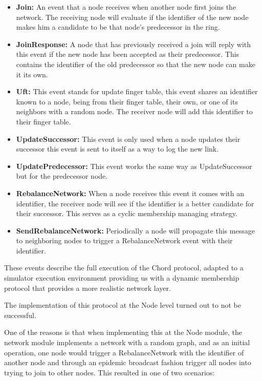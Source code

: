 \begin{itemize}
  \item \textbf{Join: } An event that a node receives when another node first joins
the network. The receiving node will evaluate if the identifier of the new node makes him
a candidate to be that node's predecessor in the ring.
  \item \textbf{JoinResponse: } A node that has previously received a join will reply
with this event if the new node has been accepted as their predecessor. This contains
the identifier of the old predecessor so that the new node can make it its own.
  \item \textbf{Uft: } This event stands for update finger table, this event shares
an identifier known to a node, being from their finger table, their own, or one of
its neighbors with a random node. The receiver node will add this identifier to their finger table.
  \item \textbf{UpdateSuccessor: } This event is only used when a node updates their successor
this event is sent to itself as a way to log the new link.
  \item \textbf{UpdatePredecessor: } This event works the same way as UpdateSuccessor
but for the predecessor node.
  \item \textbf{RebalanceNetwork: } When a node receives this event it comes with
an identifier, the receiver node will see if the identifier is a better candidate for
their successor. This serves as a cyclic membership managing strategy.
  \item \textbf{SendRebalanceNetwork: } Periodically a node will propagate this message
to neighboring nodes to trigger a RebalanceNetwork event with their identifier.
\end{itemize}

These events describe the full execution of the Chord protocol, adapted to a simulator
execution environment providing us with a dynamic membership protocol that provides
a more realistic network layer.

The implementation of this protocol at the Node level turned out to not be successful.

One of the reasons is that when implementing this at the Node module, the network
module implements a network with a random graph, and as an initial operation, one
node would trigger a RebalanceNetwork with the identifier of another node and through
an epidemic broadcast fashion trigger all nodes into trying to join to other nodes.
This resulted in one of two scenarios:

